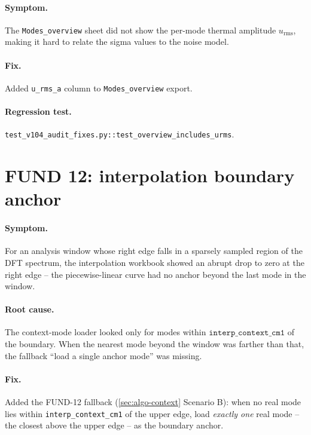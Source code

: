 \documentclass[10pt,a4paper,twoside]{article}
\newcommand{\urms}{u_{\mathrm{rms}}}
\newcommand{\fn}[1]{\texttt{#1}}
\newcommand{\cfgkey}[1]{\texttt{#1}}
\begin{document}
\paragraph{Symptom.}
The \texttt{Modes\_overview} sheet did not show the per-mode
thermal amplitude $\urms$, making it hard to relate the sigma
values to the noise model.

\paragraph{Fix.}
Added \texttt{u\_rms\_a} column to \texttt{Modes\_overview} export.

\paragraph{Regression test.}
\fn{test\_v104\_audit\_fixes.py::test\_overview\_includes\_urms}.

\section{FUND 12: interpolation boundary anchor}
\label{sec:fund-12}

\paragraph{Symptom.}
For an analysis window whose right edge falls in a sparsely
sampled region of the DFT spectrum, the interpolation workbook
showed an abrupt drop to zero at the right edge -- the
piecewise-linear curve had no anchor beyond the last mode in
the window.

\paragraph{Root cause.}
The context-mode loader looked only for modes within
$\cfgkey{interp\_context\_cm1}$ of the boundary. When the
nearest mode beyond the window was farther than that, the
fallback ``load a single anchor mode'' was missing.

\paragraph{Fix.}
Added the FUND-12 fallback (\cref{sec:algo-context} Scenario B):
when no real mode lies within \cfgkey{interp\_context\_cm1} of
the upper edge, load \emph{exactly one} real mode -- the closest
above the upper edge -- as the boundary anchor.
\end{document}
